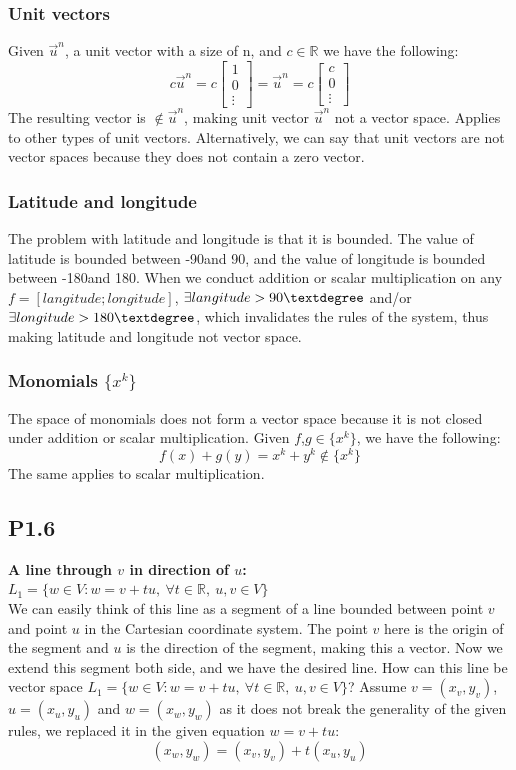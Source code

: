 \documentclass[12pt]{article}
\begin{document}
\subsubsection*{Unit vectors}
Given $\vec{u}^n$, a unit vector with a size of n, and $c \in \mathbb{R}$ we have the following:
$$c\vec{u}^n = c\begin{bmatrix}
1\\
0\\
\vdots 
\end{bmatrix} = \vec{u}^n = c\begin{bmatrix}
c\\
0\\
\vdots
\end{bmatrix} $$
The resulting vector is $\notin \vec{u}^n$, making unit vector $\vec{u}^n$ not a vector space. Applies to other types of unit vectors. Alternatively, we can say that unit vectors are not vector spaces because they does not contain a zero vector.

\subsubsection*{Latitude and longitude}
The problem with latitude and longitude is that it is bounded. The value of latitude is bounded between -90\textdegree and 90\textdegree, and the value of longitude is bounded between -180\textdegree and 180\textdegree. When we conduct addition or scalar multiplication on any $f = [langitude; longitude]$, $\exists langitude > 90\textdegree$ and/or $\exists longitude > 180\textdegree$, which invalidates the rules of the system, thus making latitude and longitude not vector space.

\subsubsection*{Monomials $\{x^k\}$}
The space of monomials does not form a vector space because it is not closed under addition or scalar multiplication. Given $f$,$g \in \{x^k\}$, we have the following:
$$ f(x) + g(y) = x^k + y^k \notin \{x^k\}$$
The same applies to scalar multiplication.


\subsection*{P1.6} 
{\bfseries A line through $v$ in direction of $u$: $L_1=\{w\in V: w = v+tu, ~\forall t\in\mathbb{R}, ~ u,v\in V\}$}\\
We can easily think of this line as a segment of a line bounded between point $v$ and point $u$ in the Cartesian coordinate system. The point $v$ here is the origin of the segment and $u$ is the direction of the segment, making this a vector. Now we extend this segment both side, and we have the desired line. How can this line be vector space $L_1=\{w\in V: w = v+tu, ~\forall t\in\mathbb{R}, ~ u,v\in V\}$?
Assume $v=(x_v, y_v)$, $u=(x_u, y_u)$ and $w=(x_w, y_w)$ as it does not break the generality of the given rules, we replaced it in the given equation $w = v+tu$:
$$ (x_w, y_w)= (x_v, y_v)+t(x_u, y_u) $$
\end{document}
